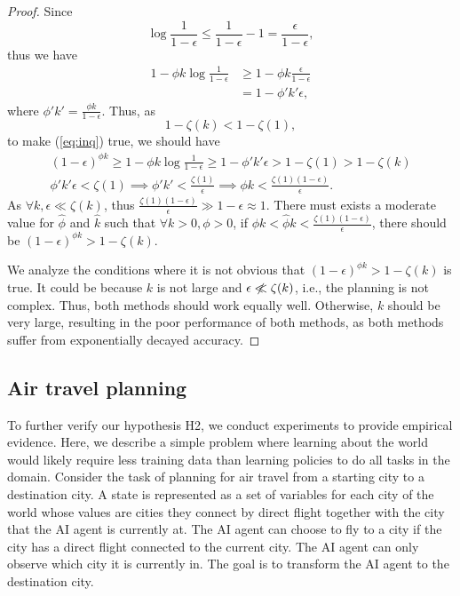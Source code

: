 \begin{proof}
    Since 
    \begin{equation}
        \log\frac{1}{1-\epsilon}\leq \frac{1}{1-\epsilon}-1=\frac{\epsilon}{1-\epsilon},
    \end{equation} thus we have
    \begin{align}
        1-\phi k \log\frac{1}{1-\epsilon}&\geq 1-\phi k \frac{\epsilon}{1-\epsilon}\\&=1-\phi'k'
        \epsilon,
    \end{align} where $\phi'k'=\frac{\phi k}{1-\epsilon}$. Thus, as \begin{equation}
        1-\zeta(k)<1-\zeta(1),
    \end{equation}to make (\ref{eq:inq}) true, we should have\begin{gather}
        (1-\epsilon)^{\phi k}\geq 1-\phi k \log\frac{1}{1-\epsilon}\geq 1-\phi'k'\epsilon > 1-\zeta(1)>1-\zeta(k)\\
        \phi'k'\epsilon<\zeta(1)\implies
        \phi'k'<\frac{\zeta(1)}{\epsilon}\implies
        \phi k < \frac{\zeta(1)(1-\epsilon)}{\epsilon}.\label{eq:final_condition}
    \end{gather}
    As $\forall k, \epsilon\ll\zeta(k)$, thus $\frac{\zeta(1)(1-\epsilon)}{\epsilon}\gg 1-\epsilon \approx 1$. There must exists a moderate value for $\hat{\phi}$ and $\hat{k}$ such that $\forall k>0 , \phi>0$, if $\phi k < \hat{\phi}\hat{k}< \frac{\zeta(1)(1-\epsilon)}{\epsilon}$, there should be $(1-\epsilon)^{\phi k}> 1-\zeta(k)$. 

    We analyze the conditions where it is not obvious that $(1-\epsilon)^{\phi k}> 1-\zeta(k)$ is true. It could be because $k$ is not large and $\epsilon \centernot\ll \zeta(k)$, i.e., the planning is not complex. Thus, both methods should work equally well. Otherwise, $k$ should be very large, resulting in the poor performance of both methods, as both methods suffer from exponentially decayed accuracy. 
\end{proof}


\subsection{Air travel planning}


To further verify our hypothesis H2, we conduct experiments to provide empirical evidence. Here, we describe a simple problem where learning about the world would likely require less training data than learning policies to do all tasks in the domain. Consider the task of planning for air travel from a starting city to a destination city. A state is represented as a set of variables for each city of the world whose values are cities they connect by direct flight together with the city that the AI agent is currently at. The AI agent can choose to fly to a city if the city has a direct flight connected to the current city. The AI agent can only observe which city it is currently in. The goal is to transform the AI agent to the destination city. 

